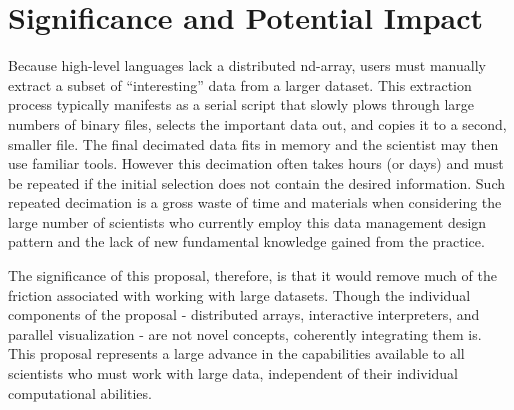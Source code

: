 \documentclass[letterpaper,12pt]{article}
\begin{document}





\section*{Significance and Potential Impact}

Because high-level languages lack a distributed nd-array, users must manually extract a subset
 of ``interesting'' data from a larger dataset.  This extraction process typically manifests 
as a serial script that slowly plows through large numbers of binary files, selects the 
important data out, and copies it to a second, smaller file.  The final decimated data fits 
in memory and the scientist may then use familiar tools.   However this decimation often takes 
hours (or days) and must be repeated if the initial selection does not contain the desired 
information.  Such repeated decimation is a gross waste of time and materials when considering 
the large number of scientists who currently employ this data management design pattern and
the lack of new fundamental knowledge gained from the practice.

The significance of this proposal, therefore, is that it would remove much of the friction 
associated with working with large datasets.  Though the individual components of the 
proposal - distributed arrays, interactive interpreters, and parallel visualization - are 
not novel concepts, coherently integrating them is.  This proposal represents a large 
advance in the capabilities available to all scientists who must work with large data, 
independent of their individual computational abilities.
\end{document}
